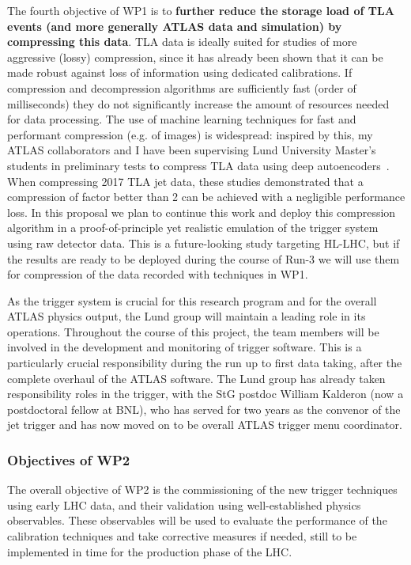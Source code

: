 The fourth objective of WP1 is to \textbf{further reduce the storage load of TLA events (and more generally ATLAS data and simulation) by compressing this data}. 
TLA data is ideally suited for studies of more aggressive (lossy) compression, since it has already been shown that it can be made robust against loss of information using dedicated calibrations. If compression and decompression algorithms are sufficiently fast (order of milliseconds) they do not significantly increase the amount of resources needed for data processing. 
The use of machine learning techniques for fast and performant compression (e.g. of images) is widespread: inspired by this, my ATLAS collaborators and I have been supervising Lund University Master’s students in preliminary tests to compress TLA data using deep autoencoders~\cite{ToBeCited}. %
When compressing 2017 TLA jet data, these studies demonstrated that a compression of factor better than 2 can be achieved with a negligible performance loss.  
In this proposal we plan to continue this work and deploy this compression algorithm in a proof-of-principle yet realistic emulation of the trigger system using raw detector data. This is a future-looking study targeting HL-LHC, but if the results are ready to be deployed during the course of Run-3 we will use them for compression of the data recorded with techniques in WP1. 

As the trigger system is crucial for this research program and for the overall ATLAS physics output, the Lund group will maintain a leading role in its operations. 
Throughout the course of this project, the team members will be involved in the development and monitoring of trigger software. 
This is a particularly crucial responsibility during the run up to first data taking, after the complete overhaul of the ATLAS software. 
The Lund group has already taken responsibility roles in the trigger, with the StG postdoc William Kalderon (now a postdoctoral fellow at BNL), who has served for two years as the convenor of the jet trigger and has now moved on to be overall ATLAS trigger menu coordinator. 

\subsubsection{Objectives of WP2}

The overall objective of WP2 is the commissioning of the new trigger techniques using early LHC data, and their validation using well-established physics observables. 
These observables will be used to evaluate the performance of the calibration techniques and take corrective measures if needed, still to be implemented in time for the production phase of the LHC. 

